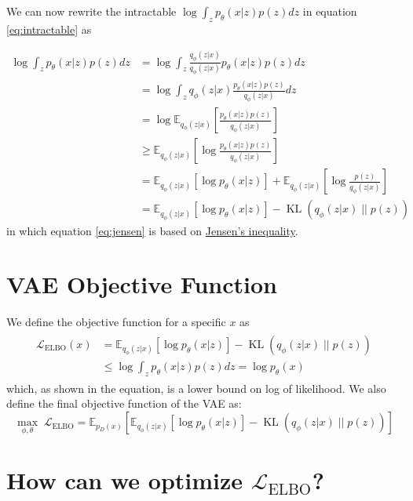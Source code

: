 \documentclass{article}
\newcommand{\kl}[2]{\operatorname{KL}({#1} \; || \; {#2})}
\begin{document}
We can now rewrite the intractable $\log \int_z p_\theta(x|z) p(z) dz$ in equation \ref{eq:intractable} as

\begin{align}
    \log \int_z p_\theta(x|z) p(z) dz &=
    \log \int_z \frac{q_\phi(z|x)}{q_\phi(z|x)} p_\theta(x|z) p(z) dz \\
    &= \log \int_z q_\phi(z|x) \frac{p_\theta(x|z) p(z)}{q_\phi(z|x)} dz \\
    &= \log \mathbb{E}_{q_\phi(z|x)}[\frac{p_\theta(x|z) p(z)}{q_\phi(z|x)}] \\
    &\ge \mathbb{E}_{q_\phi(z|x)}[\log \frac{p_\theta(x|z) p(z)}{q_\phi(z|x)}] \label{eq:jensen}\\
    &= \mathbb{E}_{q_\phi(z|x)}[\log p_\theta(x|z)] + \mathbb{E}_{q_\phi(z|x)}[\log \frac{p(z)}{q_\phi(z|x)}] \\
    &= \mathbb{E}_{q_\phi(z|x)}[\log p_\theta(x|z)] - \kl{q_\phi(z|x)}{p(z)}
\end{align}
in which equation \ref{eq:jensen} is based on \href{https://en.wikipedia.org/wiki/Jensen\%27s_inequality}{Jensen's inequality}.

\section{VAE Objective Function}
We define the objective function for a specific $x$ as
\begin{align}
    \begin{split}
        \mathcal{L}_{\text{ELBO}}(x) &= \mathbb{E}_{q_\phi(z|x)}[\log p_\theta(x|z)] - \kl{q_\phi(z|x)}{p(z)} \\
    &\le \log \int_z p_\theta(x|z) p(z) dz = \log p_\theta(x)
    \end{split}
\end{align}
which, as shown in the equation, is a lower bound on log of likelihood.
We also define the final objective function of the VAE as:
\begin{equation}
    \label{eq:elbo}
    \underset{\phi, \theta}{\max} \; \mathcal{L}_{\text{ELBO}} = \mathbb{E}_{p_D(x)} \left[ \mathbb{E}_{q_\phi(z|x)}[\log p_\theta(x|z)] - \kl{q_\phi(z|x)}{p(z)} \right]
\end{equation}

\section{How can we optimize \texorpdfstring{$\mathcal{L}_\text{ELBO}$}{ELBO}?}
\end{document}
